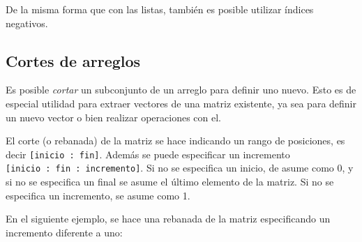 De la misma forma que con las listas, también es posible utilizar índices negativos.

\begin{Shaded}
\begin{Highlighting}[]
\OperatorTok{=}\NormalTok{ np.array([[}\NormalTok{,}\NormalTok{,}\NormalTok{,}\NormalTok{,}\NormalTok{], [}\NormalTok{,}\NormalTok{,}\NormalTok{,}\NormalTok{,}\NormalTok{]])}
    \NormalTok{(}\NormalTok{, arreglo[}\NormalTok{, }\OperatorTok{{-}}\NormalTok{]) }
\end{Highlighting}
\end{Shaded}

\subsection{Cortes de arreglos}

Es posible \emph{cortar} un subconjunto de un arreglo para definir uno
nuevo. Esto es de especial utilidad para extraer vectores de una matriz
existente, ya sea para definir un nuevo vector o bien realizar
operaciones con el.

El corte (o rebanada) de la matriz se hace indicando un rango de
posiciones, es decir \texttt{{[}inicio\ :\ fin{]}}. Además se puede
especificar un incremento \texttt{{[}inicio\ :\ fin\ :\ incremento{]}}.
Si no se especifica un inicio, de asume como 0, y si no se especifica un
final se asume el último elemento de la matriz. Si no se especifica un
incremento, se asume como 1.

\begin{Shaded}
\begin{Highlighting}[]
\OperatorTok{=}\NormalTok{ np.array([}\NormalTok{, }\NormalTok{, }\NormalTok{, }\NormalTok{, }\NormalTok{])}
\OperatorTok{=}\NormalTok{ arreglo[}\NormalTok{:}\NormalTok{]}
\end{Highlighting}
\end{Shaded}

En el siguiente ejemplo, se hace una rebanada de la matriz especificando
un incremento diferente a uno:

